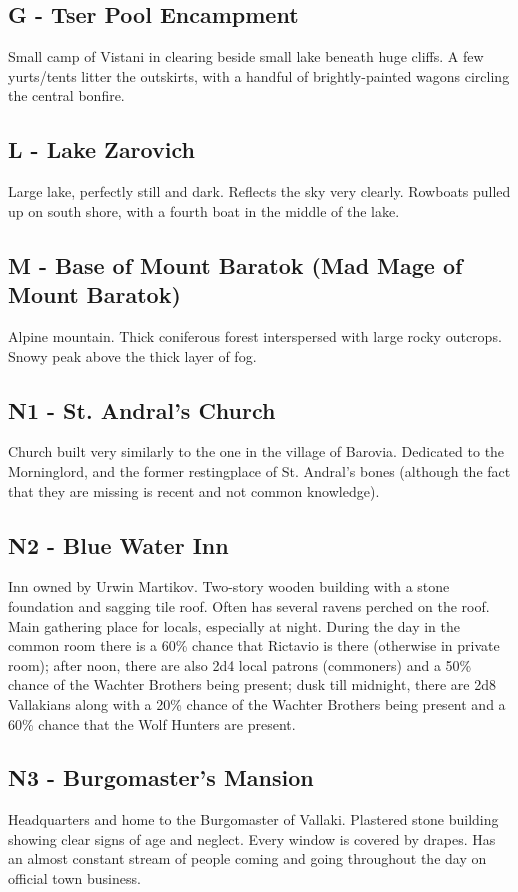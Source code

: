 \documentclass[a4paper,11pt]{article}
\begin{document}
\subsection{G - Tser Pool Encampment}
  Small camp of Vistani in clearing beside small lake beneath huge cliffs. A few yurts/tents litter the
  outskirts, with a handful of brightly-painted wagons circling the central bonfire.
\subsection{L - Lake Zarovich}
  Large lake, perfectly still and dark. Reflects the sky very clearly. Rowboats pulled up on south shore, with a
  fourth boat in the middle of the lake.
\subsection{M - Base of Mount Baratok (Mad Mage of Mount Baratok)}
  Alpine mountain. Thick coniferous forest interspersed with large rocky outcrops. Snowy peak above the thick
  layer of fog.
\subsection{N1 - St. Andral's Church}
  Church built very similarly to the one in the village of Barovia. Dedicated to the Morninglord, and the former
  restingplace of St. Andral's bones (although the fact that they are missing is recent and not common 
  knowledge).
\subsection{N2 - Blue Water Inn}
  Inn owned by Urwin Martikov. Two-story wooden building with a stone foundation and sagging tile roof. Often 
  has several ravens perched on the roof. Main gathering place for locals, especially at night. During the day 
  in the common room there is a 60\% chance that Rictavio is there (otherwise in private room); after noon, 
  there are also 2d4 local patrons (commoners) and a 50\% chance of the Wachter Brothers being present; dusk 
  till midnight, there are 2d8 Vallakians along with a 20\% chance of the Wachter Brothers being present and a 
  60\% chance that the Wolf Hunters are present.
\subsection{N3 - Burgomaster's Mansion}
  Headquarters and home to the Burgomaster of Vallaki. Plastered stone building showing clear signs of age and 
  neglect. Every window is covered by drapes. Has an almost constant stream of people coming and going 
  throughout the day on official town business.
\end{document}
